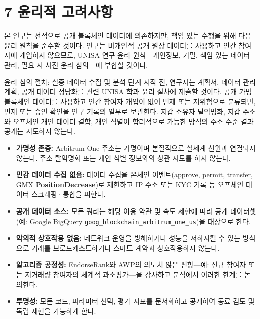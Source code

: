\clearpage
{}
\section*{7 \textbf{윤리적 고려사항}}
\label{sec:ethics-considerations}

본 연구는 전적으로 공개 블록체인 데이터에 의존하지만, 책임 있는 수행을 위해 다음 윤리 원칙을 준수할 것이다. 연구는 비개인적 공개 원장 데이터를 사용하고 인간 참여자에 개입하지 않으므로, UNISA 연구 윤리 원칙---개인정보, 기밀, 책임 있는 데이터 관리, 필요 시 사전 윤리 심의---에 부합할 것이다.


윤리 심의 절차: 실증 데이터 수집 및 분석 단계 시작 전, 연구자는 계획서, 데이터 관리 계획, 공개 데이터 정당화를 관련 UNISA 학과 윤리 절차에 제출할 것이다. 공개 가명 블록체인 데이터를 사용하고 인간 참여자 개입이 없어 면제 또는 저위험으로 분류되면, 면제 또는 승인 확인을 연구 기록의 일부로 보관한다. 지갑 소유자 탈익명화, 지갑 주소와 오프체인 개인 데이터 결합, 개인 식별이 합리적으로 가능한 방식의 주소 수준 결과 공개는 시도하지 않는다.



\begin{itemize}
\item[\textbullet] \textbf{가명성 존중:} Arbitrum One 주소는 가명이며 본질적으로 실세계 신원과 연결되지 않는다. 주소 탈익명화 또는 개인 식별 정보와의 상관 시도를 하지 않는다.
\item[\textbullet] \textbf{민감 데이터 수집 없음:} 데이터 수집을 온체인 이벤트(approve, permit, transfer, GMX \textbf{PositionDecrease})로 제한하고 IP 주소 또는 KYC 기록 등 오프체인 데이터 스크래핑·통합을 피한다.
\end{itemize}

\begin{itemize}
\item[\textbullet] \textbf{공개 데이터 소스:} 모든 쿼리는 해당 이용 약관 및 속도 제한에 따라 공개 데이터셋(예: Google BigQuery \texttt{goog\_blockchain\_arbitrum\_one\_us})을 대상으로 한다.
\item[\textbullet] \textbf{악의적 상호작용 없음:} 네트워크 운영을 방해하거나 성능을 저하시킬 수 있는 방식으로 거래를 브로드캐스트하거나 스마트 계약과 상호작용하지 않는다.
\end{itemize}

\begin{itemize}
\item[\textbullet] \textbf{알고리즘 공정성:} EndorseRank와 AWP의 의도치 않은 편향---예: 신규 참여자 또는 저거래량 참여자의 체계적 과소평가---을 감사하고 분석에서 이러한 한계를 논의한다.
\item[\textbullet] \textbf{투명성:} 모든 코드, 파라미터 선택, 평가 지표를 문서화하고 공개하여 동료 검토 및 독립 재현을 가능하게 한다.
\end{itemize}


